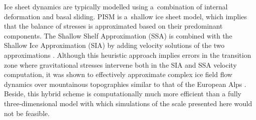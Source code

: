 \documentclass[tc, manuscript]{copernicus}
\begin{document}
    Ice sheet dynamics are typically modelled using a~combination of internal
    deformation and basal sliding. PISM is a~shallow ice sheet model, which
    implies that the balance of stresses is approximated based on their
    predominant components. The Shallow Shelf Approximation (SSA) is combined
    with the Shallow Ice Approximation (SIA) by adding velocity solutions of
    the two approximations \citep[Eqs.~7--9 and 15]{Winkelmann.etal.2011}.
    Although this heuristic approach implies errors in the transition zone
    where gravitational stresses intervene both in the SIA and SSA velocity
    computation, it was shown to effectively approximate complex ice field flow
    dynamics over mountainous topographies similar to that of the European Alps
    \citep{Golledge.etal.2012, Ziemen.etal.2016}. Beside, this hybrid scheme is
    computationally much more efficient than a fully three-dimensional model
    with which simulations of the scale presented here would not be feasible.
\end{document}
